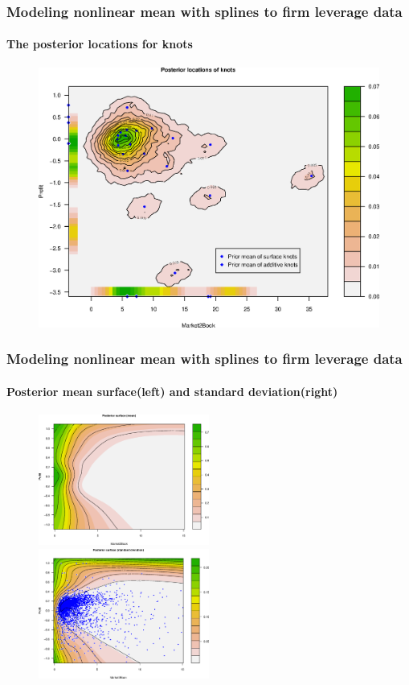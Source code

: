 \documentclass[11pt]{beamer}
\begin{document}
\begin{frame}[plain]
  \frametitle{Modeling nonlinear mean with splines to firm leverage data}
  \framesubtitle{The posterior locations for knots}
  \begin{center}
    \begin{figure}
      \includegraphics[height=0.8\textheight]{RajanPostKnots.eps}
    \end{figure}
  \end{center}
\end{frame}

\begin{frame}
  \frametitle{Modeling nonlinear mean with splines to firm leverage data}
  \framesubtitle{Posterior mean surface(left) and standard deviation(right)}
  \begin{center}
    \begin{figure}
      \includegraphics[width=0.5\textwidth]{RajanPostMean.eps}~~~\includegraphics[width=0.5\textwidth]{RajanPostSD.eps}
    \end{figure}
  \end{center}
\end{frame}
\end{document}
